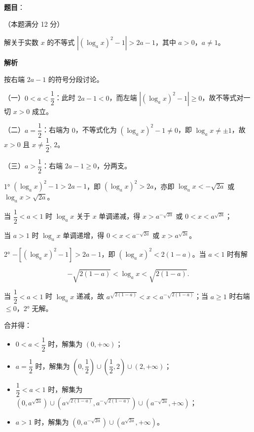 \begin{answer}

\textbf{题目}：

（本题满分 12 分）

解关于实数 $x$ 的不等式 $\left|(\log_{a}x)^{2}-1\right|>2a-1$，其中 $a>0$，$a\ne 1$。

\textbf{解析}

按右端 $2a-1$ 的符号分段讨论。

（一）$0<a<\dfrac{1}{2}$：此时 $2a-1<0$，而左端 $\left|(\log_{a}x)^{2}-1\right|\ge 0$，故不等式对一切 $x>0$ 成立。

（二）$a=\dfrac{1}{2}$：右端为 $0$，不等式化为 $(\log_{a}x)^{2}-1\ne 0$，即 $\log_{a}x\ne\pm 1$，故 $x>0$ 且 $x\ne\dfrac{1}{2},\,2$。

（三）$a>\dfrac{1}{2}$：右端 $2a-1\ge 0$，分两支。

1° $(\log_{a}x)^{2}-1>2a-1$，即 $(\log_{a}x)^{2}>2a$，亦即 $\log_{a}x<-\sqrt{2a}$ 或 $\log_{a}x>\sqrt{2a}$。

当 $\dfrac{1}{2}<a<1$ 时 $\log_{a}x$ 关于 $x$ 单调递减，得 $x>a^{-\sqrt{2a}}$ 或 $0<x<a^{\sqrt{2a}}$；

当 $a>1$ 时 $\log_{a}x$ 单调递增，得 $0<x<a^{-\sqrt{2a}}$ 或 $x>a^{\sqrt{2a}}$。

2° $-\left[(\log_{a}x)^{2}-1\right]>2a-1$，即 $(\log_{a}x)^{2}<2(1-a)$。当 $a<1$ 时有解

\nopagebreak[4]
\[
-\sqrt{2(1-a)}<\log_{a}x<\sqrt{2(1-a)}.
\]

当 $\dfrac{1}{2}<a<1$ 时 $\log_{a}x$ 递减，故 $a^{\sqrt{2(1-a)}}<x<a^{-\sqrt{2(1-a)}}$；当 $a\ge 1$ 时右端 $\le 0$，2° 无解。

合并得：

\begin{itemize}
\item $0<a<\dfrac{1}{2}$ 时，解集为 $(0,+\infty)$；
\item $a=\dfrac{1}{2}$ 时，解集为 $\left(0,\dfrac{1}{2}\right)\cup\left(\dfrac{1}{2},2\right)\cup(2,+\infty)$；
\item $\dfrac{1}{2}<a<1$ 时，解集为 $\left(0,a^{\sqrt{2a}}\right)\cup\left(a^{\sqrt{2(1-a)}},a^{-\sqrt{2(1-a)}}\right)\cup\left(a^{-\sqrt{2a}},+\infty\right)$；
\item $a>1$ 时，解集为 $\left(0,a^{-\sqrt{2a}}\right)\cup\left(a^{\sqrt{2a}},+\infty\right)$。
\end{itemize}


\end{answer}

